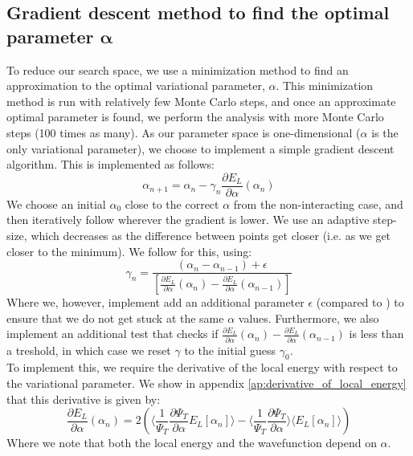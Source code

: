 \documentclass[a4paper, 10pt]{article}
\begin{document}
	\subsection{Gradient descent method to find the optimal parameter $\boldsymbol{\alpha}$}\label{sec:Gradient_descent_theory}
	To reduce our search space, we use a minimization method to find an approximation to the optimal variational parameter, $\alpha$. This minimization method is run with relatively few Monte Carlo steps, and once an approximate optimal parameter is found, we perform the analysis with more Monte Carlo steps (100 times as many). As our parameter space is one-dimensional ($\alpha$ is the only variational parameter), we choose to implement a simple gradient descent algorithm. This is implemented as follows:
	\begin{equation}
	\alpha_{n+1}=\alpha_n-\gamma_n \frac{\partial E_L}{\partial \alpha} (\alpha_n)
	\end{equation}
	We choose an initial $\alpha_0$ close to the correct $\alpha$ from the non-interacting case, and then iteratively follow wherever the gradient is lower. We use an adaptive step-size, which decreases as the difference between points get closer (i.e. as we get closer to the minimum). We follow \cite{doi:10.1093/imanum/8.1.141} for this, using:
	\begin{equation}
	\gamma_n=\frac{(\alpha_n-\alpha_{n-1})+\epsilon}{[\frac{\partial E_L}{\partial \alpha}(\alpha_n)-\frac{\partial E_L}{\partial \alpha}(\alpha_{n-1})]}
	\end{equation}
	Where we, however, implement add an additional parameter $\epsilon$ (compared to \cite{doi:10.1093/imanum/8.1.141}) to ensure that we do not get stuck at the same $\alpha$ values. Furthermore, we also implement an additional test that checks if $\frac{\partial E_L}{\partial \alpha}(\alpha_n)-\frac{\partial E_L}{\partial \alpha}(\alpha_{n-1})$ is less than a treshold, in which case we reset $\gamma$ to the initial guess $\gamma_0$.\\
	\linebreak	
	To implement this, we require the derivative of the local energy with respect to the variational parameter. We show in appendix \ref{ap:derivative_of_local_energy} that this derivative is given by:
	\begin{equation}
	\frac{\partial E_L}{\partial \alpha}(\alpha_n)=2\left(\big\langle \frac{1}{\Psi_T}\frac{\partial \Psi_T}{\partial \alpha}E_L[\alpha_n]\big\rangle-\big\langle \frac{1}{\Psi_T}\frac{\partial \Psi_T}{\partial \alpha}\big\rangle \big\langle E_L[\alpha_n]\big\rangle\right)
	\end{equation}
	Where we note that both the local energy and the wavefunction depend on $\alpha$.
\end{document}

